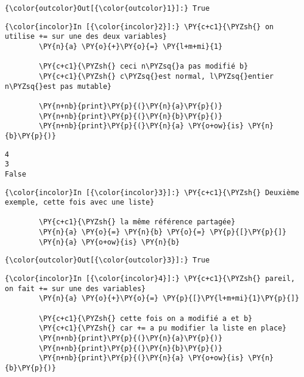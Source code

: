 \begin{Verbatim}[commandchars=\\\{\},frame=single,framerule=0.3mm,rulecolor=\color{cellframecolor}]
{\color{outcolor}Out[{\color{outcolor}1}]:} True
\end{Verbatim}
            
    \begin{Verbatim}[commandchars=\\\{\},frame=single,framerule=0.3mm,rulecolor=\color{cellframecolor}]
{\color{incolor}In [{\color{incolor}2}]:} \PY{c+c1}{\PYZsh{} on utilise += sur une des deux variables}
        \PY{n}{a} \PY{o}{+}\PY{o}{=} \PY{l+m+mi}{1}
        
        \PY{c+c1}{\PYZsh{} ceci n\PYZsq{}a pas modifié b}
        \PY{c+c1}{\PYZsh{} c\PYZsq{}est normal, l\PYZsq{}entier n\PYZsq{}est pas mutable}
        
        \PY{n+nb}{print}\PY{p}{(}\PY{n}{a}\PY{p}{)}
        \PY{n+nb}{print}\PY{p}{(}\PY{n}{b}\PY{p}{)}
        \PY{n+nb}{print}\PY{p}{(}\PY{n}{a} \PY{o+ow}{is} \PY{n}{b}\PY{p}{)}
\end{Verbatim}


    \begin{Verbatim}[commandchars=\\\{\},frame=single,framerule=0.3mm,rulecolor=\color{cellframecolor}]
4
3
False
\end{Verbatim}

    \begin{Verbatim}[commandchars=\\\{\},frame=single,framerule=0.3mm,rulecolor=\color{cellframecolor}]
{\color{incolor}In [{\color{incolor}3}]:} \PY{c+c1}{\PYZsh{} Deuxième exemple, cette fois avec une liste}
        
        \PY{c+c1}{\PYZsh{} la même référence partagée}
        \PY{n}{a} \PY{o}{=} \PY{n}{b} \PY{o}{=} \PY{p}{[}\PY{p}{]}
        \PY{n}{a} \PY{o+ow}{is} \PY{n}{b}
\end{Verbatim}


\begin{Verbatim}[commandchars=\\\{\},frame=single,framerule=0.3mm,rulecolor=\color{cellframecolor}]
{\color{outcolor}Out[{\color{outcolor}3}]:} True
\end{Verbatim}
            
    \begin{Verbatim}[commandchars=\\\{\},frame=single,framerule=0.3mm,rulecolor=\color{cellframecolor}]
{\color{incolor}In [{\color{incolor}4}]:} \PY{c+c1}{\PYZsh{} pareil, on fait += sur une des variables}
        \PY{n}{a} \PY{o}{+}\PY{o}{=} \PY{p}{[}\PY{l+m+mi}{1}\PY{p}{]}
        
        \PY{c+c1}{\PYZsh{} cette fois on a modifié a et b}
        \PY{c+c1}{\PYZsh{} car += a pu modifier la liste en place}
        \PY{n+nb}{print}\PY{p}{(}\PY{n}{a}\PY{p}{)}
        \PY{n+nb}{print}\PY{p}{(}\PY{n}{b}\PY{p}{)}
        \PY{n+nb}{print}\PY{p}{(}\PY{n}{a} \PY{o+ow}{is} \PY{n}{b}\PY{p}{)}
\end{Verbatim}


